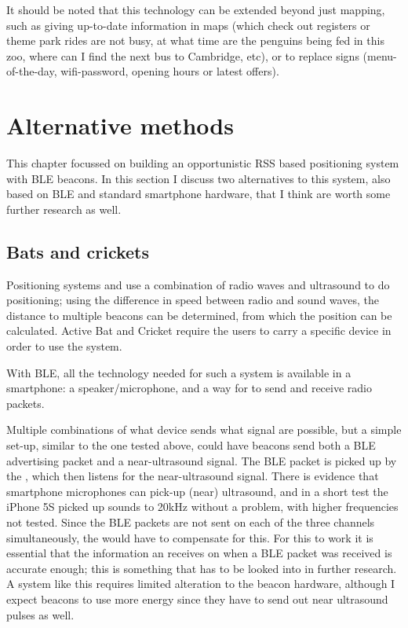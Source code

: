 It should be noted that this technology can be extended beyond just mapping, such as giving up-to-date information in maps (which check out registers or theme park rides are not busy, at what time are the penguins being fed in this zoo, where can I find the next bus to Cambridge, etc), or to replace signs (menu-of-the-day, wifi-password, opening hours or latest offers). 

\section{Alternative methods}
This chapter focussed on building an opportunistic RSS based positioning system with BLE beacons.
In this section I discuss two alternatives to this system, also based on BLE and standard smartphone hardware, that I think are worth some further research as well.

\subsection{\BLE Bats and crickets}
\label{sec:architecture-bats}

Positioning systems  \citep{harter2002anatomy} and  \citep{priyantha2000cricket} use a combination of radio waves and ultrasound to do positioning; using the difference in speed between radio and sound waves, the distance to multiple beacons can be determined, from which the position can be calculated.
Active Bat and Cricket require the users to carry a specific device in order to use the system.

With BLE, all the technology needed for such a system is available in a smartphone: a speaker/microphone, and a way for \apps to send and receive radio packets.

Multiple combinations of what device sends what signal are possible, but a simple set-up, similar to the one tested above, could have beacons send both a BLE advertising packet and a near-ultrasound signal.
The BLE packet is picked up by the \device, which then listens for the near-ultrasound signal.
There is evidence that smartphone microphones can pick-up (near) ultrasound\citep{arentz2011near,bihler2011smartguide}, and in a short test the iPhone 5S picked up sounds to 20kHz without a problem, with higher frequencies not tested.
Since the BLE packets are not sent on each of the three channels simultaneously, the \device would have to compensate for this.
For this to work it is essential that the information an \app receives on when a BLE packet was received is accurate enough; this is something that has to be looked into in further research.
A system like this requires limited alteration to the beacon hardware, although I expect beacons to use more energy since they have to send out near ultrasound pulses as well.

